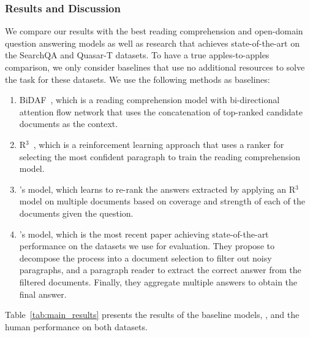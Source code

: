 \subsubsection{Results and Discussion}

We compare our results with the best reading comprehension and open-domain question answering models as well as research that achieves state-of-the-art on the SearchQA and Quasar-T datasets. 
To have a true apples-to-apples comparison, we only consider baselines that use no additional resources to solve the task for these datasets. 
We use the following methods as baselines:
\begin{enumerate}[leftmargin=*]
    \item BiDAF~\citep{seo2016bidirectional}, which is a reading comprehension model with bi-di\-rectional attention flow network that uses the concatenation of top-ranked candidate documents as the context.
    \item R$^3$~\citep{wang2017r}, which is a reinforcement learning approach that uses a ranker for selecting the most confident paragraph to train the reading comprehension model.
    \item \citet{wang2017evidence}'s model, which learns to re-rank the answers extracted by applying an R$^3$ model on multiple documents based on coverage and strength of each of the documents given the question.
    \item \citet{lin2018denoising}'s model, which is the most recent paper achieving state-of-the-art performance on the datasets we use for evaluation. 
    They propose to decompose the process into a document selection to filter out noisy paragraphs, and a paragraph reader to extract the correct answer from the filtered documents. 
    Finally, they aggregate multiple answers to obtain the final answer.
\end{enumerate}
%
Table~\ref{tab:main_results} presents the results of the baseline models, \tracrnet, and the human performance on both datasets.

